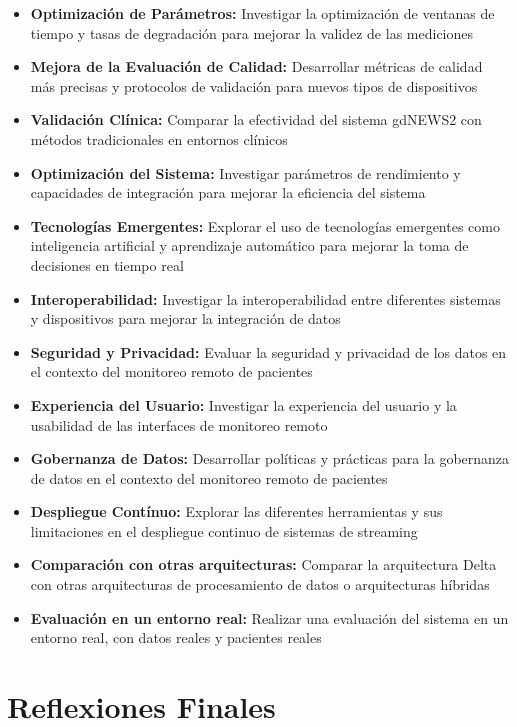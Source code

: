 \begin{itemize}
    \item \textbf{Optimización de Parámetros:} Investigar la optimización de ventanas de tiempo y tasas de degradación para mejorar la validez de las mediciones
    \item \textbf{Mejora de la Evaluación de Calidad:} Desarrollar métricas de calidad más precisas y protocolos de validación para nuevos tipos de dispositivos
    \item \textbf{Validación Clínica:} Comparar la efectividad del sistema gdNEWS2 con métodos tradicionales en entornos clínicos
    \item \textbf{Optimización del Sistema:} Investigar parámetros de rendimiento y capacidades de integración para mejorar la eficiencia del sistema
    \item \textbf{Tecnologías Emergentes:} Explorar el uso de tecnologías emergentes como inteligencia artificial y aprendizaje automático para mejorar la toma de decisiones en tiempo real
    \item \textbf{Interoperabilidad:} Investigar la interoperabilidad entre diferentes sistemas y dispositivos para mejorar la integración de datos
    \item \textbf{Seguridad y Privacidad:} Evaluar la seguridad y privacidad de los datos en el contexto del monitoreo remoto de pacientes
    \item \textbf{Experiencia del Usuario:} Investigar la experiencia del usuario y la usabilidad de las interfaces de monitoreo remoto
    \item \textbf{Gobernanza de Datos:} Desarrollar políticas y prácticas para la gobernanza de datos en el contexto del monitoreo remoto de pacientes
    \item \textbf{Despliegue Contínuo: } Explorar las diferentes herramientas y sus limitaciones en el despliegue continuo de sistemas de streaming
    \item \textbf{Comparación con otras arquitecturas:} Comparar la arquitectura Delta con otras arquitecturas de procesamiento de datos o arquitecturas híbridas
    \item \textbf{Evaluación en un entorno real:} Realizar una evaluación del sistema en un entorno real, con datos reales y pacientes reales
\end{itemize}
\newpage
\section{Reflexiones Finales}

